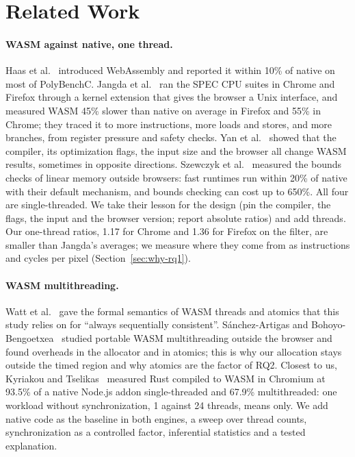 \section{Related Work}
\label{sec:related}

\paragraph{WASM against native, one thread.} Haas et al.~\cite{haas2017}
introduced WebAssembly and reported it within 10\% of native on most of
PolyBenchC. Jangda et al.~\cite{jangda2019} ran the SPEC CPU suites in
Chrome and Firefox through a kernel extension that gives the browser a Unix
interface, and measured WASM 45\% slower than native on average in Firefox
and 55\% in Chrome; they traced it to more instructions, more loads and
stores, and more branches, from register pressure and safety checks. Yan et
al.~\cite{yan2021} showed that the compiler, its optimization flags, the
input size and the browser all change WASM results, sometimes in opposite
directions. Szewczyk et al.~\cite{szewczyk2022} measured the bounds checks
of linear memory outside browsers: fast runtimes run within 20\% of native
with their default mechanism, and bounds checking can cost up to 650\%. All four are single-threaded. We take their
lesson for the design (pin the compiler, the flags, the input and the
browser version; report absolute ratios) and add threads. Our one-thread
ratios, 1.17 for Chrome and 1.36 for Firefox on the filter, are smaller than
Jangda's averages; we measure where they come from as instructions and
cycles per pixel (Section~\ref{sec:why-rq1}).

\paragraph{WASM multithreading.} Watt et al.~\cite{watt2019} gave the
formal semantics of WASM threads and atomics that this study relies on for
``always sequentially consistent''. S{\'a}nchez-Artigas and
Bohoyo-Bengoetxea~\cite{sanchez2025} studied portable WASM multithreading
outside the browser and found overheads in the allocator and in atomics;
this is why our allocation stays outside the timed region and why atomics
are the factor of RQ2. Closest to us, Kyriakou and
Tselikas~\cite{kyriakou2022} measured Rust compiled to WASM in Chromium at
93.5\% of a native Node.js addon single-threaded and 67.9\% multithreaded:
one workload without synchronization, 1 against 24 threads, means only. We
add native code as the baseline in both engines, a sweep over thread counts,
synchronization as a controlled factor, inferential statistics and a tested
explanation.

